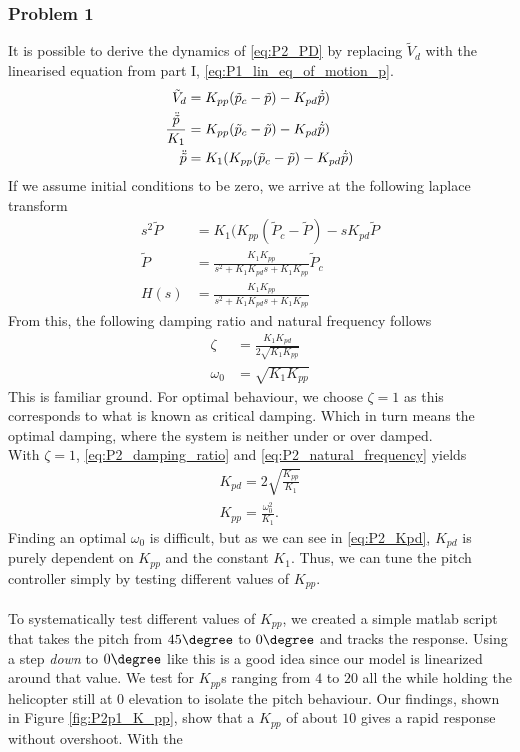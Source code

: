\subsubsection{Problem 1}
It is possible to derive the dynamics of \eqref{eq:P2_PD} by replacing $\tilde{V}_d$ with the linearised equation from part I, \eqref{eq:P1_lin_eq_of_motion_p}.
\begin{align*}
    \tilde{V}_d &= K_{pp} (\tilde{p}_c - \tilde{p}) - K_{pd}\dot{\tilde{p}}) \\
    \frac{\ddot{\tilde{p}}}{K_1} &= K_{pp} (\tilde{p}_c - \tilde{p}) - K_{pd}\dot{\tilde{p}}) \\
    \ddot{\tilde{p}} &= K_1(K_{pp}(\tilde{p}_c - \tilde{p}) - K_{pd} \dot{\tilde{p}})
\end{align*}
If we assume initial conditions to be zero, we arrive at the following laplace transform
\begin{align}
    s^2\tilde{P} &= K_1(K_{pp}(\tilde{P}_c - \tilde{P}) - sK_{pd} \tilde{P}  \nonumber \\
    \tilde{P} &= \frac{K_1 K_{pp}}{s^2 + K_1 K_{pd} s + K_1 K_{pp}} \tilde{P}_c \nonumber \\
    H(s) &= \frac{K_1 K_{pp}}{s^2 + K_1 K_{pd} s + K_1 K_{pp}}
\end{align}
From this, the following damping ratio and natural frequency follows
\begin{align}
    \zeta &= \frac{K_1 K_{pd}}{2\sqrt{K_1 K_{pp}}} \label{eq:P2_damping_ratio} \\
    \omega_0 &= \sqrt{K_1 K_{pp}} \label{eq:P2_natural_frequency}
\end{align}
This is familiar ground. For optimal behaviour, we choose $\zeta = 1$ as this corresponds to what is known as critical damping. Which in turn means the optimal damping, where the system is neither under or over damped.\\
With $\zeta = 1$, \eqref{eq:P2_damping_ratio} and \eqref{eq:P2_natural_frequency} yields 
\begin{align}
    K_{pd} = 2\sqrt{\frac{K_{pp}}{K_1}} \label{eq:P2_Kpd} \\
    K_{pp} = \frac{\omega_0^2}{K_1}. \label{eq:P2_Kpp} 
\end{align}
Finding an optimal $\omega_0$ is difficult, but as we can see in \eqref{eq:P2_Kpd}, $K_{pd}$ is purely dependent on $K_{pp}$ and the constant $K_1$. Thus, we can tune the pitch controller simply by testing different values of $K_{pp}$.\\
\\
To systematically test different values of $K_{pp}$, we created a simple matlab script that takes the pitch from $45\degree$ to $0\degree$ and tracks the response. Using a step \textit{down} to $0\degree$ like this is a good idea since our model is linearized around that value. We test for $K_{pp}$s ranging from $4$ to $20$ all the while holding the helicopter still at 0 elevation to isolate the pitch behaviour. Our findings, shown in Figure \ref{fig:P2p1_K_pp}, show that a $K_{pp}$ of about $10$ gives a rapid response without overshoot. With the 
